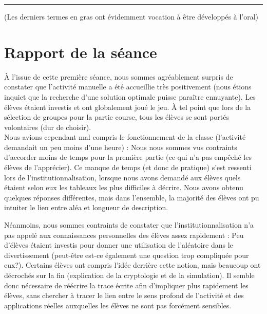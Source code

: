 \documentclass{article}
\begin{document}
\vspace{2em}
\hrule
\vspace{1em}

\normalsize{(Les derniers termes en gras ont évidemment vocation à être développés à l'oral)}

\vspace{2em}

\section{Rapport de la séance}

À l'issue de cette première séance, nous sommes agréablement surpris de constater que l'activité manuelle a été accueillie très positivement (nous étions inquiet que la recherche d'une solution optimale puisse paraître ennuyante). Les élèves étaient investis et ont globalement joué le jeu. À tel point que lors de la sélection de groupes pour la partie course, tous les élèves se sont portés volontaires (dur de choisir).\\

Nous avions cependant mal compris le fonctionnement de la classe (l'activité demandait un peu moins d'une heure) : Nous nous sommes vus contraints d'accorder moins de temps pour la première partie (ce qui n'a pas empêché les élèves de l'apprécier). Ce manque de temps (et donc de pratique) s'est ressenti lors de l'institutionnalisation, lorsque nous avons demandé aux élèves quels étaient selon eux les tableaux les plus difficiles à décrire. Nous avons obtenu quelques réponses différentes, mais dans l'ensemble, la majorité des élèves ont pu intuiter le lien entre aléa et longueur de description.

\newpage

Néanmoins, nous sommes contraints de constater que l'institutionnalisation n'a pas appelé aux connaissances personnelles des élèves assez rapidement : Peu d'élèves étaient investis pour donner une utilisation de l'aléatoire dans le divertissement (peut-être est-ce également une question trop compliquée pour eux?). Certains élèves ont compris l'idée derrière cette notion, mais beaucoup ont décrochés sur la fin (explication de la cryptologie et de la simulation). Il semble donc nécessaire de réécrire la trace écrite afin d'impliquer plus rapidement les élèves, sans chercher à tracer le lien entre le sens profond de l'activité et des applications réelles auxquelles les élèves ne sont pas forcément sensibles.\\
\end{document}

